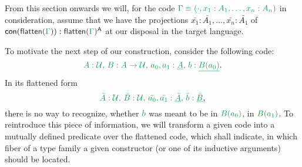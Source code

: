 \documentclass[12pt,headings=optiontohead,openany,oneside,a4paper]{book}
\theoremstyle{definition}
\newcommand{\UU}{\mathcal{U}}
\newcommand{\gr}[1]{{\color{ForestGreen}#1}}
\newcommand{\grm}[1]{\ensuremath{\gr{#1}}}
\newcommand{\blm}[1]{\ensuremath{{\color{Black}#1}}}
\newcommand{\CC}{\mathsf{A}} %
\newcommand{\con}[1]{\mathsf{con}(\grm{#1})}
\newcommand{\flatten}[1]{\blm{\mathsf{flatten}(\grm{#1})}}
\begin{document}
From this section onwards we will, for the code $\grm{\Gamma \equiv (\cdot, x_1 : A_1, \ldots, x_n : A_n)}$
in consideration, assume that we have the projections $\bar{x_1} : \bar{A_1}, \ldots, \bar{x_n} : \bar{A_1}$ of
$\con{\grm{\flatten{\Gamma}}} : \grm{\flatten{\Gamma}}^\CC$ at our disposal in the target
language.

To motivate the next step of our construction, consider the following code:
\begin{equation*}
\grm{
A : \UU,\, B : A \to \UU,\, a_0, a_1 : \underline{A},\, b : \underline{B(a_0)}
} \text{.}
\end{equation*}
In its flattened form
\begin{equation*}
\grm{
\bar{A} : \UU,\, \bar{B} : \UU,\, \bar{a_0}, \bar{a_1} : \underline{\bar{A}},\, \bar{b} : \underline{\bar{B}}
} \text{,}
\end{equation*}
there is no way to recognize, whether \grm{b} was meant to be in \grm{B(a_0)},
in \grm{B(a_1)}.
To reintroduce this piece of information, we will transform a given code into a
mutually defined predicate over the flattened code, which shall indicate, in which
fiber of a type family a given constructor (or one of its inductive arguments)
should be located.
\end{document}

